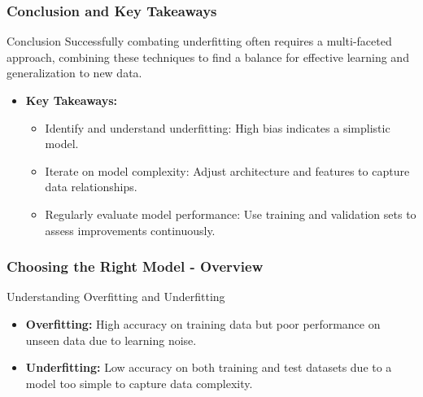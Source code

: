 \documentclass[aspectratio=169]{beamer}
\begin{document}
\begin{frame}[fragile]
    \frametitle{Conclusion and Key Takeaways}
    \begin{block}{Conclusion}
        Successfully combating underfitting often requires a multi-faceted approach, combining these techniques to find a balance for effective learning and generalization to new data.
    \end{block}
    \begin{itemize}
        \item \textbf{Key Takeaways:}
        \begin{itemize}
            \item Identify and understand underfitting: High bias indicates a simplistic model.
            \item Iterate on model complexity: Adjust architecture and features to capture data relationships.
            \item Regularly evaluate model performance: Use training and validation sets to assess improvements continuously.
        \end{itemize}
    \end{itemize}
\end{frame}

\begin{frame}[fragile]
    \frametitle{Choosing the Right Model - Overview}
    \begin{block}{Understanding Overfitting and Underfitting}
        \begin{itemize}
            \item \textbf{Overfitting:} High accuracy on training data but poor performance on unseen data due to learning noise.
            \item \textbf{Underfitting:} Low accuracy on both training and test datasets due to a model too simple to capture data complexity.
        \end{itemize}
    \end{block}
\end{frame}
\end{document}
